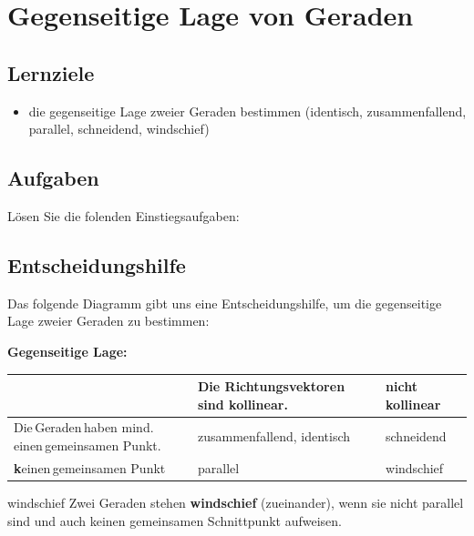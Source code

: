 \section{Gegenseitige Lage von Geraden}

\subsection*{Lernziele}
\begin{itemize}
  \item die gegenseitige Lage zweier Geraden bestimmen (identisch,
    zusammenfallend,
    parallel,
    schneidend,
    windschief)
\end{itemize}

\subsection*{Aufgaben}

Lösen Sie die folenden Einstiegsaufgaben:



\newpage

\subsection{Entscheidungshilfe}
Das folgende Diagramm gibt uns eine Entscheidungshilfe, um die
gegenseitige Lage zweier Geraden zu bestimmen:

\vspace{3mm}
\textbf{Gegenseitige Lage:}

\begin{tabular}{p{60mm}|p{50mm}|p{50mm}}
  & Die Richtungsvektoren sind kollinear. &  \textbf{nicht} kollinear\\\hline
Die\,Geraden\,haben mind.\,einen\,gemeinsamen Punkt.  & zusammenfallend, identisch& schneidend\\\hline
\textbf{k}einen\,gemeinsamen Punkt & parallel & windschief
\end{tabular}

\begin{definition}{windschief}{}
  Zwei Geraden stehen \textbf{windschief} (zueinander), wenn sie nicht
  parallel sind und auch keinen gemeinsamen Schnittpunkt aufweisen.
\end{definition}


